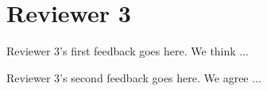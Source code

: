 \section*{Reviewer 3}

\begin{feedback}[1]
Reviewer 3's first feedback goes here.
%
\response
%
We think ...
\end{feedback}

\begin{feedback}[2]
Reviewer 3's second feedback goes here.
%
\response
%
We agree ...
\end{feedback}
